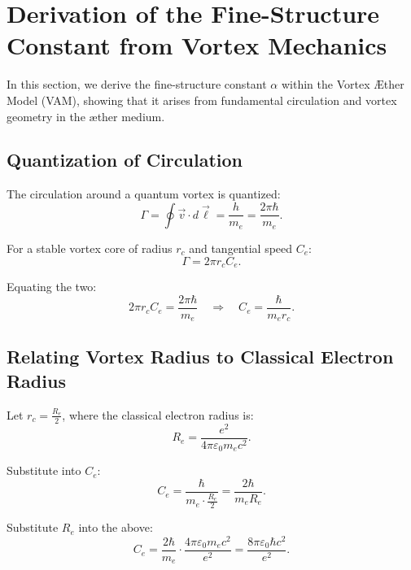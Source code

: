
\section{Derivation of the Fine-Structure Constant from Vortex Mechanics}
\label{sec:appendix-alpha}

In this section, we derive the fine-structure constant \( \alpha \) within the Vortex Æther Model (VAM), showing that it arises from fundamental circulation and vortex geometry in the æther medium.

\subsection{Quantization of Circulation}

The circulation around a quantum vortex is quantized:
\begin{equation}
    \Gamma = \oint \vec{v} \cdot d\vec{\ell} = \frac{h}{m_e} = \frac{2\pi \hbar}{m_e}.
\end{equation}

For a stable vortex core of radius \( r_c \) and tangential speed \( C_e \):
\begin{equation}
    \Gamma = 2\pi r_c C_e.
\end{equation}

Equating the two:
\begin{equation}
    2\pi r_c C_e = \frac{2\pi \hbar}{m_e} \quad \Rightarrow \quad C_e = \frac{\hbar}{m_e r_c}.
\end{equation}

\subsection{Relating Vortex Radius to Classical Electron Radius}

Let \( r_c = \frac{R_e}{2} \), where the classical electron radius is:
\begin{equation}
    R_e = \frac{e^2}{4\pi \varepsilon_0 m_e c^2}.
\end{equation}

Substitute into \( C_e \):
\begin{equation}
    C_e = \frac{\hbar}{m_e \cdot \frac{R_e}{2}} = \frac{2\hbar}{m_e R_e}.
\end{equation}

Substitute \( R_e \) into the above:
\begin{equation}
    C_e = \frac{2\hbar}{m_e} \cdot \frac{4\pi \varepsilon_0 m_e c^2}{e^2} = \frac{8\pi \varepsilon_0 \hbar c^2}{e^2}.
\end{equation}

